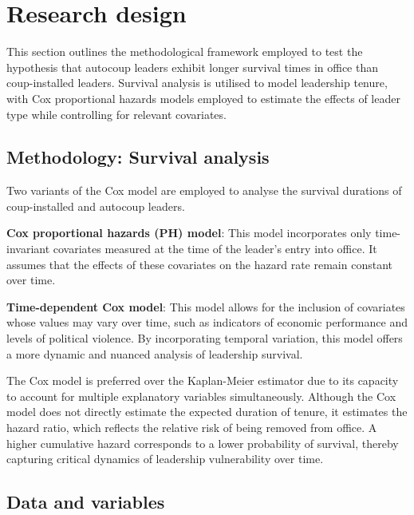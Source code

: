 \documentclass[
  12pt,
]{report}
\begin{document}
\section{Research design}\label{research-design-1}

This section outlines the methodological framework employed to test the
hypothesis that autocoup leaders exhibit longer survival times in office
than coup-installed leaders. Survival analysis is utilised to model
leadership tenure, with Cox proportional hazards models employed to
estimate the effects of leader type while controlling for relevant
covariates.

\subsection*{Methodology: Survival
analysis}\label{methodology-survival-analysis}

Two variants of the Cox model are employed to analyse the survival
durations of coup-installed and autocoup leaders.

\textbf{Cox proportional hazards (PH) model}: This model incorporates
only time-invariant covariates measured at the time of the leader's
entry into office. It assumes that the effects of these covariates on
the hazard rate remain constant over time.

\textbf{Time-dependent Cox model}: This model allows for the inclusion
of covariates whose values may vary over time, such as indicators of
economic performance and levels of political violence. By incorporating
temporal variation, this model offers a more dynamic and nuanced
analysis of leadership survival.

The Cox model is preferred over the Kaplan-Meier estimator due to its
capacity to account for multiple explanatory variables simultaneously.
Although the Cox model does not directly estimate the expected duration
of tenure, it estimates the hazard ratio, which reflects the relative
risk of being removed from office. A higher cumulative hazard
corresponds to a lower probability of survival, thereby capturing
critical dynamics of leadership vulnerability over time.

\subsection*{Data and variables}\label{data-and-variables-1}
\end{document}
